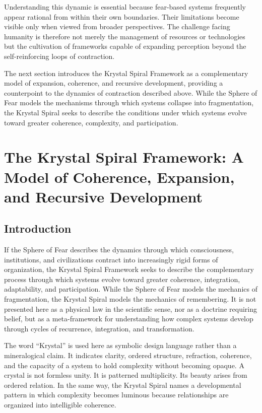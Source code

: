 \documentclass[12pt]{article}
\begin{document}
Understanding this dynamic is essential because fear-based systems frequently appear rational from within their own boundaries. Their limitations become visible only when viewed from broader perspectives. The challenge facing humanity is therefore not merely the management of resources or technologies but the cultivation of frameworks capable of expanding perception beyond the self-reinforcing loops of contraction.

The next section introduces the Krystal Spiral Framework as a complementary model of expansion, coherence, and recursive development, providing a counterpoint to the dynamics of contraction described above. While the Sphere of Fear models the mechanisms through which systems collapse into fragmentation, the Krystal Spiral seeks to describe the conditions under which systems evolve toward greater coherence, complexity, and participation.

\section{The Krystal Spiral Framework: A Model of Coherence, Expansion, and Recursive Development}

\subsection{Introduction}

If the Sphere of Fear describes the dynamics through which consciousness, institutions, and civilizations contract into increasingly rigid forms of organization, the Krystal Spiral Framework seeks to describe the complementary process through which systems evolve toward greater coherence, integration, adaptability, and participation. While the Sphere of Fear models the mechanics of fragmentation, the Krystal Spiral models the mechanics of remembering. It is not presented here as a physical law in the scientific sense, nor as a doctrine requiring belief, but as a meta-framework for understanding how complex systems develop through cycles of recurrence, integration, and transformation.

The word ``Krystal'' is used here as symbolic design language rather than a mineralogical claim. It indicates clarity, ordered structure, refraction, coherence, and the capacity of a system to hold complexity without becoming opaque. A crystal is not formless unity. It is patterned multiplicity. Its beauty arises from ordered relation. In the same way, the Krystal Spiral names a developmental pattern in which complexity becomes luminous because relationships are organized into intelligible coherence.
\end{document}
